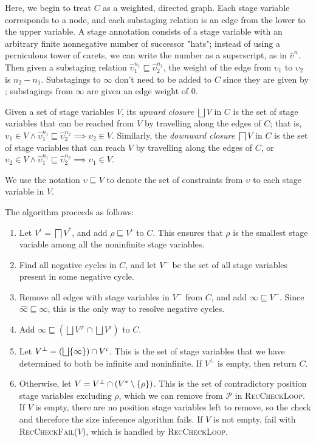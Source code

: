 \documentclass[nonacm,screen,10pt]{acmart}
\begin{document}
Here, we begin to treat $C$ as a weighted, directed graph. Each stage variable corresponds to a node, and each substaging relation is an edge from the lower to the upper variable. A stage annotation consists of a stage variable with an arbitrary finite nonnegative number of successor "hats"; instead of using a perniculous tower of carets, we can write the number as a superscript, as in $\hat{\upsilon}^n$. Then given a substaging relation $\hat{\upsilon}_1^{n_1} \sqsubseteq \hat{\upsilon}_2^{n_2}$, the weight of the edge from $\upsilon_1$ to $\upsilon_2$ is $n_2 - n_1$. Substagings to $\infty$ don't need to be added to $C$ since they are given by ; substagings from $\infty$ are given an edge weight of $0$.

Given a set of stage variables $V$, its \textit{upward closure} $\bigsqcup V$ in $C$ is the set of stage variables that can be reached from $V$ by travelling along the edges of $C$; that is, $\upsilon_1 \in V \wedge \hat{\upsilon}_1^{n_1} \sqsubseteq \hat{\upsilon}_2^{n_2} \implies \upsilon_2 \in V$. Similarly, the \textit{downward closure} $\bigsqcap V$ in $C$ is the set of stage variables that can reach $V$ by travelling along the edges of $C$, or $\upsilon_2 \in V \wedge \hat{\upsilon}_1^{n_1} \sqsubseteq \hat{\upsilon}_2^{n_2} \implies \upsilon_1 \in V$.

We use the notation $\upsilon \sqsubseteq V$ to denote the set of constraints from $\upsilon$ to each stage variable in $V$.

The algorithm proceeds as follows:

\begin{enumerate}
    \item Let $V^\iota = \bigsqcap V^*$, and add $\rho \sqsubseteq V^\iota$ to $C$. This ensures that $\rho$ is the smallest stage variable among all the noninfinite stage variables.
    \item Find all negative cycles in $C$, and let $V^-$ be the set of all stage variables present in some negative cycle.
    \item Remove all edges with stage variables in $V^-$ from $C$, and add $\infty \sqsubseteq V^-$. Since $\widehat{\infty} \sqsubseteq \infty$, this is the only way to resolve negative cycles.
    \item Add $\infty \sqsubseteq \left(\bigsqcup V^\neq \cap \bigsqcup V^\iota\right)$ to $C$.
    \item Let $V^\bot = \left(\bigsqcup \{\infty\}\right) \cap V^\iota$. This is the set of stage variables that we have determined to both be infinite and noninfinite. If $V^\bot$ is empty, then return $C$.
    \item Otherwise, let $V = V^\bot \cap (V^* \setminus \{\rho\})$. This is the set of contradictory position stage variables excluding $\rho$, which we can remove from $\mathcal{P}$ in \textsc{RecCheckLoop}. If $V$ is empty, there are no position stage variables left to remove, so the check and therefore the size inference algorithm fails. If $V$ is not empty, fail with \textsc{RecCheckFail}($V$), which is handled by \textsc{RecCheckLoop}.
\end{enumerate}
\end{document}

